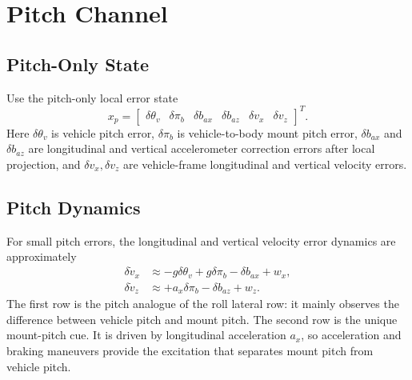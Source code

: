 \documentclass[11pt]{article}
\newcommand{\T}{^{T}}
\newcommand{\thetav}{\delta\theta_v}
\newcommand{\pim}{\delta\pi_b}
\begin{document}
\section{Pitch Channel}

\subsection{Pitch-Only State}

Use the pitch-only local error state
\begin{equation}
  x_p=
  \begin{bmatrix}
  \thetav & \pim & \delta b_{ax} & \delta b_{az} & \delta v_x & \delta v_z
  \end{bmatrix}\T .
\end{equation}
Here \(\thetav\) is vehicle pitch error, \(\pim\) is vehicle-to-body mount pitch
error, \(\delta b_{ax}\) and \(\delta b_{az}\) are longitudinal and vertical
accelerometer correction errors after local projection, and
\(\delta v_x,\delta v_z\) are vehicle-frame longitudinal and vertical velocity
errors.

\subsection{Pitch Dynamics}

For small pitch errors, the longitudinal and vertical velocity error dynamics
are approximately
\begin{align}
  \delta \dot v_x &\approx -g\thetav + g\pim - \delta b_{ax} + w_x, \label{eq:pitch-vx}\\
  \delta \dot v_z &\approx +a_x\pim - \delta b_{az} + w_z . \label{eq:pitch-vz}
\end{align}
The first row is the pitch analogue of the roll lateral row: it mainly observes
the difference between vehicle pitch and mount pitch. The second row is the
unique mount-pitch cue. It is driven by longitudinal acceleration \(a_x\), so
acceleration and braking maneuvers provide the excitation that separates mount
pitch from vehicle pitch.
\end{document}
